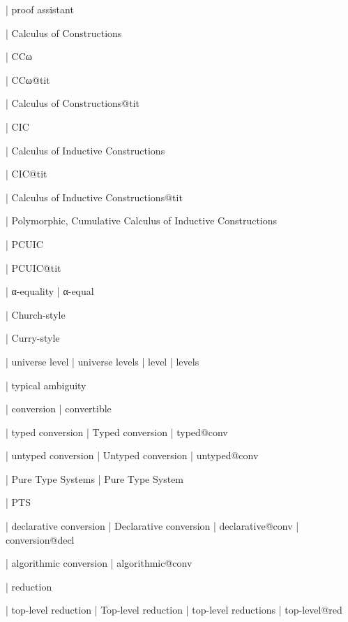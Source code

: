   | proof assistant



  | Calculus of Constructions

  | CCω

  | CCω@tit

  | Calculus of Constructions@tit

  | CIC

  | Calculus of Inductive Constructions

  | CIC@tit

  | Calculus of Inductive Constructions@tit

  | Polymorphic, Cumulative Calculus of Inductive Constructions

  | PCUIC

  | PCUIC@tit

  | α-equality
  | α-equal 

  | Church-style

  | Curry-style

  | universe level
  | universe levels
  | level
  | levels

  | typical ambiguity


  | conversion
  | convertible

  | typed conversion
  | Typed conversion
  | typed@conv

  | untyped conversion
  | Untyped conversion
  | untyped@conv

  | Pure Type Systems
  | Pure Type System

  | PTS

  | declarative conversion
  | Declarative conversion
  | declarative@conv
  | conversion@decl

  | algorithmic conversion
  | algorithmic@conv

  | reduction

  | top-level reduction
  | Top-level reduction
  | top-level reductions
  | top-level@red

